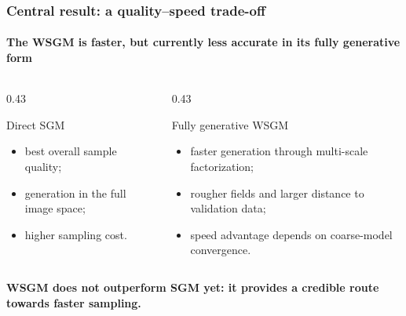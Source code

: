 \documentclass[t,10pt,aspectratio=169]{beamer}
\begin{document}
\begin{frame}
  \frametitle{Central result: a quality--speed trade-off}
  \framesubtitle{The WSGM is faster, but currently less accurate in its fully generative form}
  \begin{columns}[T,onlytextwidth]
    \begin{column}{0.43\textwidth}
      \begin{block}{Direct SGM}
        \small
        \begin{itemize}
          \item best overall sample quality;
          \item generation in the full image space;
          \item higher sampling cost.
        \end{itemize}
      \end{block}
    \end{column}
    \begin{column}{0.43\textwidth}
      \begin{alertblock}{Fully generative WSGM}
        \small
        \begin{itemize}
          \item faster generation through multi-scale factorization;
          \item rougher fields and larger distance to validation data;
          \item speed advantage depends on coarse-model convergence.
        \end{itemize}
      \end{alertblock}
    \end{column}
  \end{columns}
  \vspace{1.8ex}
  \centering
  {\large\color{CEAred}\textbf{WSGM does not outperform SGM yet: it provides a credible route towards faster sampling.}}
\end{frame}
\end{document}
